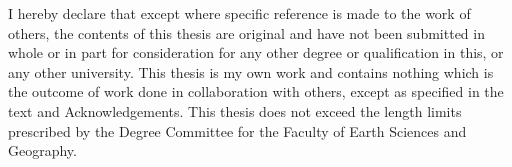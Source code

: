 
\begin{declaration}

I hereby declare that except where specific reference is made to the work of others, the
contents of this thesis are original and have not been submitted in whole or in part for
consideration for any other degree or qualification in this, or any other university. This thesis
is my own work and contains nothing which is the outcome of work done in collaboration
with others, except as specified in the text and Acknowledgements. This thesis does not
exceed the length limits prescribed by the Degree Committee for the Faculty of Earth
Sciences and Geography.


\end{declaration}

